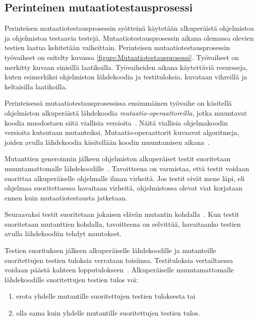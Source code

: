 \documentclass[finnish, grading]{tktltiki2}
\theoremstyle{definition}
\theoremstyle{remark}
\begin{document}

\subsection{Perinteinen mutaatiotestausprosessi}

Perinteisen mutaatiotestausprosessin syötteinä käytetään alkuperäistä ohjelmistoa ja ohjelmistoa testaavia testejä. Mutaatiotestausprosessin aikana olemassa olevien testien laatua kehitetään vaiheittain. Perinteisen mutaatiotestausprosessin työvaiheet on esitelty kuvassa \ref{figure:Mutaatiotestausprosessi}. Työvaiheet on merkitty kuvaan sinisillä laatikoilla. Työvaiheiden aikana käytettäviä resursseja, kuten esimerkiksi ohjelmiston lähdekoodia ja testituloksia, kuvataan vihreillä ja keltaisilla laatikoilla.

Perinteisessä mutaatiotestausprosessissa ensimmäinen työvaihe on käsitellä ohjelmiston alkuperäistä lähdekoodia \textit{mutaatio-operaattoreilla}, jotka muuntavat koodia muodostaen siitä viallisia versioita~\cite[s. 869]{Ma:Harrold:Kwon:2006}. Näitä viallisia ohjelmakoodin versioita kutsutaan mutanteiksi. Mutaatio-operaattorit kuvaavat algoritmeja, joiden avulla lähdekoodia käsitellään koodin muuntamisen aikana~\cite[s. 35]{Offutt:Untch:2001}.

Mutanttien generoinnin jälkeen ohjelmiston alkuperäiset testit suoritetaan muuntamattomalle lähdekoodille~\cite[s. 652]{Jia:Harman:2011}. Tavoitteena on varmistaa, että testit voidaan suorittaa alkuperäiselle ohjelmalle ilman virheitä. Jos testit eivät mene läpi, eli ohjelmaa suoritettaessa havaitaan virheitä, ohjelmistossa olevat viat korjataan ennen kuin mutaatiotestausta jatketaan. 

Seuraavaksi testit suoritetaan jokaisen elävän mutantin kohdalla~\cite[s. 35-36]{Offutt:Untch:2001}. Kun testit suoritetaan mutanttien kohdalla, tavoitteena on selvittää, havaitaanko testien avulla lähdekoodiin tehdyt muutokset. 

Testien suorituksen jälkeen alkuperäiselle lähdekoodille ja mutanteille suoritettujen testien tuloksia verrataan toisiinsa. Testituloksia vertailtaessa voidaan päästä kahteen lopputulokseen~\cite[s. 36]{DeMillo:Lipton:Sayward:1978}. Alkuperäiselle muuntamattomalle lähdekoodille suoritettujen testien tulos voi: 
\begin{enumerate}
  \item erota yhdelle mutantille suoritettujen testien tuloksesta tai
  \item olla sama kuin yhdelle mutantille suoritettujen testien tulos.
\end{enumerate}
\end{document}
